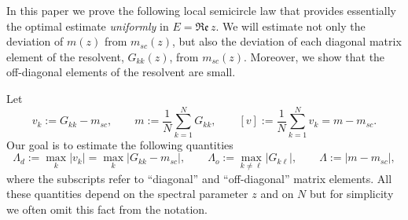 \documentclass[draft]{article}
\newcommand{\be}{\begin{equation}}
\newcommand{\ee}{\end{equation}}
\newcommand{\barv}{ {[ v ]}}
\newcommand{\re}{{\mathfrak{Re} \, }}
\numberwithin{equation}{section}
\numberwithin{theorem}{section}
\numberwithin{definition}{section}
\numberwithin{remark}{section}
\begin{document}
In this paper we prove  the following 
local semicircle law that provides essentially the optimal estimate
{\it uniformly} in  $E = \re z$. We will estimate not only 
the deviation of $m(z)$ from $m_{sc}(z)$,  but also
the deviation of each diagonal matrix element of the resolvent, $G_{kk}(z)$,
from $m_{sc}(z)$. Moreover, we show that the off-diagonal
elements of the resolvent are small.

Let
$$
  v_k := G_{kk}-m_{sc}, \qquad m:=\frac{1}{N}\sum_{k=1}^N G_{kk}, \qquad  \barv:=\frac{1}{N}
  \sum_{k=1}^N v_k = m-m_{sc} . 
$$
Our goal is to  estimate the following  quantities
\be\label{defLambda}
  \Lambda_d:=\max_k |v_k| = \max_k |G_{kk}-m_{sc}|, \qquad
 \Lambda_o:=\max_{k\ne \ell} |G_{k\ell}|, \qquad \Lambda:=|m-m_{sc}|,
\ee
where the subscripts refer to ``diagonal'' and ``off-diagonal'' matrix elements. 
All these quantities depend on the spectral parameter $z$ and on $N$ but for simplicity we often omit
this fact from the notation.  
\end{document}
